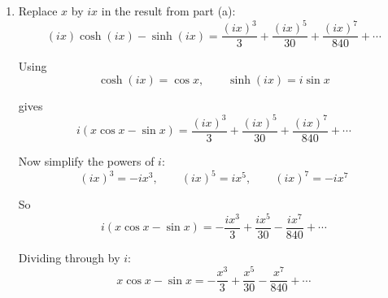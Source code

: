 \documentclass[leqno]{article}
\begin{document}
\begin{enumerate}[
  label=\textbf{\arabic*.},
  leftmargin=*,
  topsep=0pt,
  partopsep=0pt,
  parsep=0pt
]
\begin{djsSolution}
\begin{enumerate}[label=\textbf{(\alph*)}]
  and
  \begin{align*}
  \sinh x
  &=\frac{1}{2}\left[\left(1+x+\frac{x^2}{2!}+\frac{x^3}{3!}+\frac{x^4}{4!}+\cdots\right)
  -\left(1-x+\frac{x^2}{2!}-\frac{x^3}{3!}+\frac{x^4}{4!}+\cdots\right)\right] \\
  &=x+\frac{x^3}{3!}+\frac{x^5}{5!}+\frac{x^7}{7!}+\cdots \\
  &=x+\frac{x^3}{6}+\frac{x^5}{120}+\frac{x^7}{5040}+\cdots
  \end{align*}

  Therefore
  \begin{align*}
  x\cosh x-\sinh x
  &=x\left(1+\frac{x^2}{2}+\frac{x^4}{24}+\frac{x^6}{720}+\cdots\right)
  -\left(x+\frac{x^3}{6}+\frac{x^5}{120}+\frac{x^7}{5040}+\cdots\right) \\
  &=\left(x+\frac{x^3}{2}+\frac{x^5}{24}+\frac{x^7}{720}+\cdots\right)
  -\left(x+\frac{x^3}{6}+\frac{x^5}{120}+\frac{x^7}{5040}+\cdots\right) \\
  &=\left(\frac{1}{2}-\frac{1}{6}\right)x^3+\left(\frac{1}{24}-\frac{1}{120}\right)x^5+\left(\frac{1}{720}-\frac{1}{5040}\right)x^7+\cdots \\
  &=\frac{x^3}{3}+\frac{x^5}{30}+\frac{x^7}{840}+\cdots
  \end{align*}

  Hence the first three non-zero terms are
  \[
  x\cosh x-\sinh x=\frac{x^3}{3}+\frac{x^5}{30}+\frac{x^7}{840}+\cdots
  \]

  \item Replace $x$ by $ix$ in the result from part (a):
  \[
  (ix)\cosh(ix)-\sinh(ix)
  =\frac{(ix)^3}{3}+\frac{(ix)^5}{30}+\frac{(ix)^7}{840}+\cdots
  \]

  Using
  \[
  \cosh(ix)=\cos x,\qquad \sinh(ix)=i\sin x
  \]

  gives
  \[
  i(x\cos x-\sin x)
  =\frac{(ix)^3}{3}+\frac{(ix)^5}{30}+\frac{(ix)^7}{840}+\cdots
  \]

  Now simplify the powers of $i$:
  \[
  (ix)^3=-ix^3,\qquad
  (ix)^5=ix^5,\qquad
  (ix)^7=-ix^7
  \]

  So
  \[
  i(x\cos x-\sin x)
  =-\frac{ix^3}{3}+\frac{ix^5}{30}-\frac{ix^7}{840}+\cdots
  \]

  Dividing through by $i$:
  \[
  x\cos x-\sin x=-\frac{x^3}{3}+\frac{x^5}{30}-\frac{x^7}{840}+\cdots
  \]
\end{enumerate}
\end{djsSolution}


\newpage

\questionitem


\end{enumerate}
\end{document}
